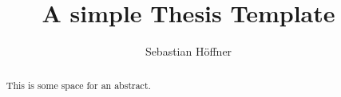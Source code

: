 \documentclass[11pt, twoside, openright, utf8, bachelor, english, subfiles]{base/thesis}
\institute{Institute of Cognitive Science\\Institute for Computer Science}
\title{A simple Thesis Template}
\author{Sebastian Höffner}
\begin{document}
\maketitle

\begin{abstract}
%
This is some space for an abstract.
\end{abstract}

%

\tableofcontents

\mainpart

%

\appendix

\listoffigures



\declaration
\end{document}
